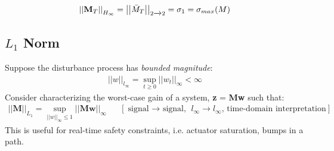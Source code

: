 \documentclass{article}[12pt]
\newcommand{\norm}[1]{\left|\left|#1\right|\right|}
\begin{document}
    \begin{align*}
        \norm{\textbf{M}_T}_{H_{\infty}} = \norm{\Bar{M}_T}_{2\xrightarrow{}2} = \sigma_1 = \sigma_{max}(M) 
    \end{align*}

\subsection{$L_1$ Norm}
Suppose the disturbance process has \textit{bounded magnitude}:
    \begin{align*}
        \norm{w}_{l_{\infty}} = \sup_{t\geq0} \norm{w_t}_{\infty} < \infty
    \end{align*}
Consider characterizing the worst-case gain of a system, \textbf{z} = \textbf{Mw} such that:
    \begin{align*}
        \norm{\textbf{M}}_{L_{1}} = \sup_{\norm{w}_{\infty}\leq 1}\norm{\textbf{Mw}}_{\infty} && [\text{signal $\xrightarrow{}$ signal, }l_{\infty}\xrightarrow{}l_{\infty}\text{, time-domain interpretation}]
    \end{align*}
This is useful for real-time safety constraints, i.e. actuator saturation, bumps in a path.\\
\end{document}
